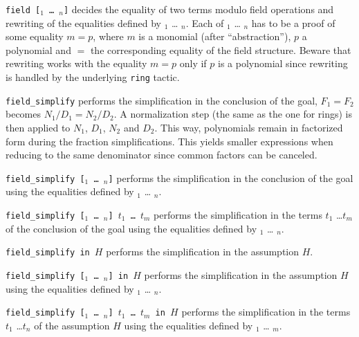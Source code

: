 \begin{Variants}
  \item {\tt field [\term$_1$ {\ldots} \term$_n$]} decides the equality of two
    terms modulo field operations and rewriting of the equalities
    defined by \term$_1$ {\ldots} \term$_n$. Each of \term$_1$
    {\ldots} \term$_n$ has to be a proof of some equality $m = p$,
    where $m$ is a monomial (after ``abstraction''),
    $p$ a polynomial and $=$ the corresponding equality of the field structure.
    Beware that rewriting works with the equality $m=p$ only if $p$ is a 
    polynomial since rewriting is handled by the underlying {\tt ring}
    tactic.
  \item {\tt field\_simplify} 
     performs the simplification in the conclusion of the goal, $F_1 = F_2$
     becomes $N_1/D_1 = N_2/D_2$. A normalization step (the same as the
     one for rings) is then applied to $N_1$, $D_1$, $N_2$ and
     $D_2$. This way, polynomials remain in factorized form during the
     fraction simplifications. This yields smaller expressions when
     reducing to the same denominator since common factors can be
     canceled.

  \item {\tt field\_simplify   [\term$_1$ {\ldots} \term$_n$]}
     performs the simplification in the conclusion of the goal using
    the equalities
    defined by \term$_1$ {\ldots} \term$_n$.

  \item {\tt field\_simplify   [\term$_1$ {\ldots} \term$_n$] $t_1$ \ldots
$t_m$}
     performs the simplification in the terms $t_1$ \ldots $t_m$
    of the conclusion of the goal using
    the equalities
    defined by \term$_1$ {\ldots} \term$_n$. 

  \item {\tt field\_simplify in $H$}  
     performs the simplification in the assumption $H$.

  \item {\tt field\_simplify   [\term$_1$ {\ldots} \term$_n$] in $H$}
     performs the simplification in the assumption $H$ using
    the equalities
    defined by \term$_1$ {\ldots} \term$_n$. 

  \item {\tt field\_simplify   [\term$_1$ {\ldots} \term$_n$] $t_1$ \ldots
$t_m$ in $H$}
     performs the simplification in the terms $t_1$ \ldots $t_n$
    of the assumption $H$ using
    the equalities
    defined by \term$_1$ {\ldots} \term$_m$. 


\end{Variants}
